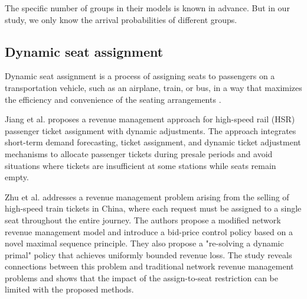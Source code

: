 The specific number of groups in their models is known in advance. But in our study, we only know the arrival probabilities of different groups.










\subsection{Dynamic seat assignment}
Dynamic seat assignment is a process of assigning seats to passengers on a transportation vehicle, such as an airplane, train, or bus, in a way that maximizes the efficiency and convenience of the seating arrangements \cite{hamdouch2011schedule, berge1993demand}. 

Jiang et al. \cite{jiang2015dynamic} proposes a revenue management approach for high-speed rail (HSR) passenger ticket assignment with dynamic adjustments. The approach integrates short-term demand forecasting, ticket assignment, and dynamic ticket adjustment mechanisms to allocate passenger tickets during presale periods and avoid situations where tickets are insufficient at some stations while seats remain empty.


Zhu et al. \cite{zhu2023assign} addresses a revenue management problem arising from the selling of high-speed train tickets in China, where each request must be assigned to a single seat throughout the entire journey. The authors propose a modified network revenue management model and introduce a bid-price control policy based on a novel maximal sequence principle. They also propose a "re-solving a dynamic primal" policy that achieves uniformly bounded revenue loss. The study reveals connections between this problem and traditional network revenue management problems and shows that the impact of the assign-to-seat restriction can be limited with the proposed methods.

